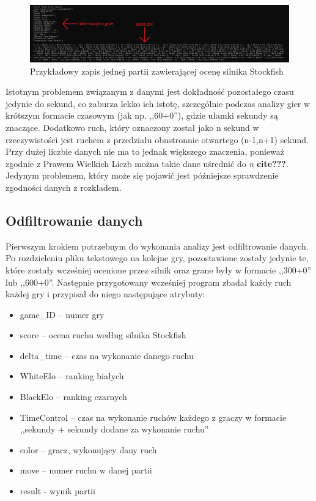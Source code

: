 \documentclass[inzynierska]{pwr_wmat_praca_dyplomowa}
\theoremstyle{plain}
\numberwithin{theorem}{chapter}
\theoremstyle{definition}
\numberwithin{theorem}{chapter}
\begin{document}
\begin{figure}[H]
	\centering
	\includegraphics[width=\textwidth]{zapis_gry.png}
	\caption{Przykładowy zapis jednej partii zawierającej ocenę silnika Stockfish}
	\label{rys:zapis_gry} 
\end{figure}
Istotnym problemem związanym z danymi jest dokładność pozostałego czasu jedynie do sekund, co zaburza lekko ich istotę, szczególnie podczas analizy gier w krótszym formacie czasowym (jak np. ,,60+0''), gdzie ułamki sekundy są  znaczące. Dodatkowo ruch, który oznaczony został jako n sekund w rzeczywistości jest ruchem z przedziału obustronnie otwartego (n-1,n+1) sekund. Przy dużej liczbie danych nie ma to jednak większego znaczenia, ponieważ zgodnie z Prawem Wielkich Liczb można takie dane uśrednić do \textit{n} \textbf{cite???}. Jedynym problemem, który może się pojawić jest późniejsze sprawdzenie zgodności danych z rozkładem. 

\subsection{Odfiltrowanie danych}

Pierwszym krokiem potrzebnym do wykonania analizy jest odfiltrowanie danych.
Po rozdzieleniu pliku tekstowego na kolejne gry, pozostawione zostały jedynie te, które zostały wcześniej ocenione przez silnik oraz grane były w formacie ,,300+0'' lub ,,600+0''. Następnie przygotowany wcześniej program zbadał każdy ruch każdej gry i przypisał do niego następujące atrybuty:
\begin{itemize}
	\item game\_ID -- numer gry
	\item score -- ocena ruchu według silnika Stockfish
	\item delta\_time -- czas na wykonanie danego ruchu
	\item WhiteElo -- ranking białych
	\item BlackElo -- ranking czarnych
	\item TimeControl -- czas na wykonanie ruchów każdego z graczy w formacie  ,,sekundy + sekundy dodane za wykonanie ruchu''
	\item color -- gracz, wykonujący dany ruch
	\item move -- numer ruchu w danej partii
	\item result - wynik partii
\end{itemize}
\end{document}
